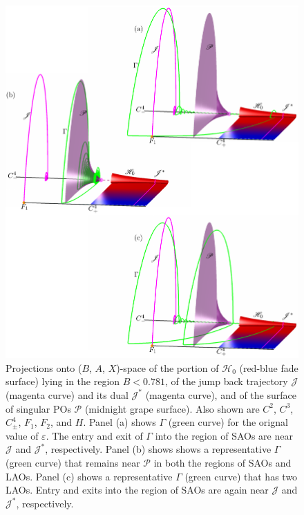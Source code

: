 \documentclass{ws-ijbc}
\begin{document}
\begin{figure}[H]
\centering
\includegraphics[]{./figures/MKMO_19.pdf}
\caption{Projections onto ($B$, $A$, $X$)-space of the portion of $\mathscr{H}_0$ (red-blue fade surface) lying in the region $B<0.781$, of the jump back trajectory $\mathscr{J}$ (magenta curve) and its dual $\mathscr{J}^*$ (magenta curve), and of the surface of singular POs $\mathscr{P}$ (midnight grape surface).  Also shown are $C^2$, $C^3$, $C^4_\pm$, $F_1$, $F_2$, and $H$.  Panel (a) shows $\Gamma$ (green curve) for the orignal value of $\varepsilon$.  The entry and exit of $\Gamma$ into the region of SAOs are near $\mathscr{J}$ and $\mathscr{J}^*$, respectively.  Panel (b) shows shows a representative $\Gamma$ (green curve) that remains near $\mathscr{P}$ in both the regions of SAOs and LAOs.  Panel (c) shows a representative $\Gamma$ (green curve) that has two LAOs.  Entry and exits into the region of SAOs are again near $\mathscr{J}$ and $\mathscr{J}^*$, respectively.}
\label{figure_19}
\end{figure}
\end{document}
